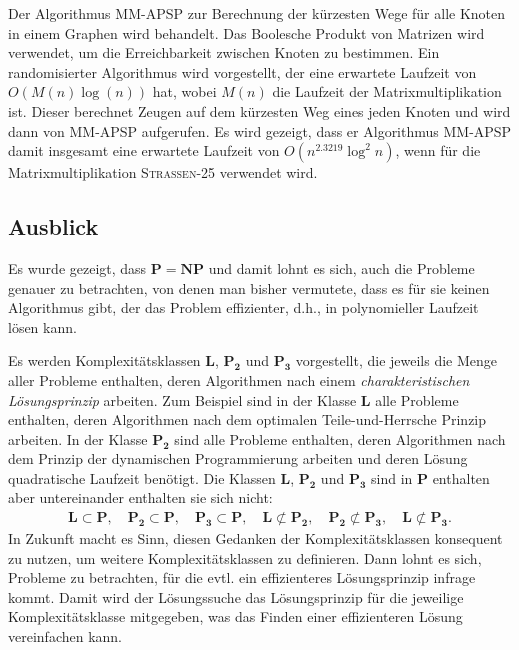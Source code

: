 \documentclass{scrartcl}
\numberwithin{equation}{section}
\begin{document}
Der Algorithmus MM-APSP zur Berechnung der kürzesten Wege für alle Knoten in einem Graphen wird behandelt. Das Boolesche Produkt von Matrizen wird verwendet, um die Erreichbarkeit zwischen Knoten zu bestimmen. Ein randomisierter Algorithmus wird vorgestellt, der eine erwartete Laufzeit von $O(M(n) \log(n))$ hat, wobei $M(n)$ die Laufzeit der Matrixmultiplikation ist. Dieser berechnet Zeugen auf dem kürzesten Weg eines jeden Knoten und wird dann von MM-APSP aufgerufen. Es wird gezeigt, dass er Algorithmus MM-APSP damit insgesamt eine erwartete Laufzeit von $O(n^{2.3219} \log^2 n)$, wenn für die Matrixmultiplikation \textsc{Strassen-25} verwendet wird.

\subsection{Ausblick}
Es wurde gezeigt, dass $\mathbf{P} = \mathbf{NP}$ und damit lohnt es sich, auch die Probleme genauer zu betrachten, von denen man bisher vermutete, dass es für sie keinen Algorithmus gibt, der das Problem effizienter, d.h., in polynomieller Laufzeit lösen kann.

Es werden Komplexitätsklassen $\mathbf{L}$, $\mathbf{P_2}$ und $\mathbf{P_3}$ vorgestellt, die jeweils die Menge aller Probleme enthalten, deren Algorithmen nach einem \textit{charakteristischen Lösungsprinzip} arbeiten. Zum Beispiel sind in der Klasse $\mathbf{L}$ alle Probleme enthalten, deren Algorithmen nach dem optimalen Teile-und-Herrsche Prinzip arbeiten. In der Klasse $\mathbf{P_2}$ sind alle Probleme enthalten, deren Algorithmen nach dem Prinzip der dynamischen Programmierung arbeiten und deren Lösung quadratische Laufzeit benötigt. Die Klassen $\mathbf{L}$, $\mathbf{P_2}$ und $\mathbf{P_3}$ sind in $\mathbf{P}$ enthalten aber untereinander enthalten sie sich nicht:
\begin{align*}
	\mathbf{L} \subset \mathbf{P}, \quad \mathbf{P_2} \subset \mathbf{P}, \quad \mathbf{P_3} \subset \mathbf{P}, \quad \mathbf{L} \not \subset \mathbf{P_2}, \quad \mathbf{P_2} \not \subset \mathbf{P_3}, \quad \mathbf{L} \not \subset \mathbf{P_3}.
\end{align*}
In Zukunft macht es Sinn, diesen Gedanken der Komplexitätsklassen konsequent zu nutzen, um weitere Komplexitätsklassen zu definieren. Dann lohnt es sich, Probleme zu betrachten, für die evtl. ein effizienteres Lösungsprinzip infrage kommt. Damit wird der Lösungssuche das Lösungsprinzip für die jeweilige Komplexitätsklasse mitgegeben, was das Finden einer effizienteren Lösung vereinfachen kann.
\end{document}
